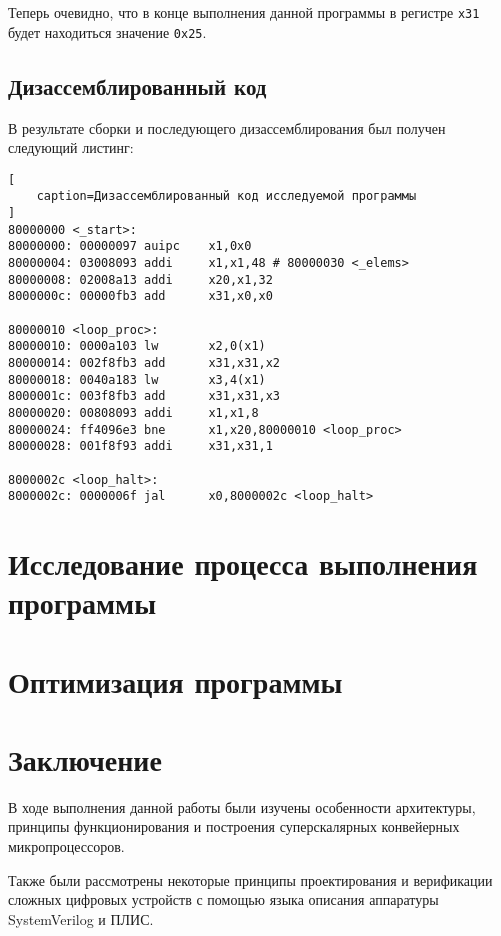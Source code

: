 \documentclass[oneside, a4paper, 12pt]{report}
\begin{document}
Теперь очевидно, что в конце выполнения данной программы в регистре
\texttt{x31} будет находиться значение \texttt{0x25}.

\section{Дизассемблированный код}

В результате сборки и последующего дизассемблирования был получен
следующий листинг:

\begin{lstlisting}[
    caption=Дизассемблированный код исследуемой программы
]
80000000 <_start>:
80000000: 00000097 auipc    x1,0x0
80000004: 03008093 addi     x1,x1,48 # 80000030 <_elems>
80000008: 02008a13 addi     x20,x1,32
8000000c: 00000fb3 add      x31,x0,x0

80000010 <loop_proc>:
80000010: 0000a103 lw       x2,0(x1)
80000014: 002f8fb3 add      x31,x31,x2
80000018: 0040a183 lw       x3,4(x1)
8000001c: 003f8fb3 add      x31,x31,x3
80000020: 00808093 addi     x1,x1,8
80000024: ff4096e3 bne      x1,x20,80000010 <loop_proc>
80000028: 001f8f93 addi     x31,x31,1

8000002c <loop_halt>:
8000002c: 0000006f jal      x0,8000002c <loop_halt>
\end{lstlisting}

\chapter{Исследование процесса выполнения программы}

\chapter{Оптимизация программы}

\chapter{Заключение}

В ходе выполнения данной работы были изучены особенности
архитектуры, принципы функционирования и построения суперскалярных
конвейерных микропроцессоров.

Также были рассмотрены некоторые принципы проектирования и
верификации сложных цифровых устройств с помощью языка описания
аппаратуры SystemVerilog и ПЛИС.
\end{document}
